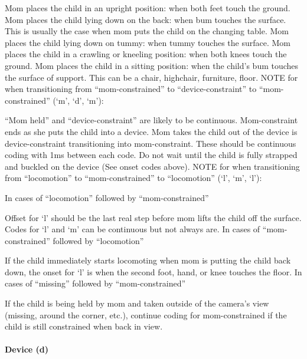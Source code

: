 \documentclass[
  12pt,
]{book}
\begin{document}
Mom places the child in an upright position: when both feet touch the ground.
Mom places the child lying down on the back: when bum touches the surface. This is usually the case when mom puts the child on the changing table.
Mom places the child lying down on tummy: when tummy touches the surface.
Mom places the child in a crawling or kneeling position: when both knees touch the ground.
Mom places the child in a sitting position: when the child's bum touches the surface of support. This can be a chair, highchair, furniture, floor.
NOTE for when transitioning from ``mom-constrained'' to ``device-constraint'' to ``mom-constrained'' (`m', `d', `m'):

``Mom held'' and ``device-constraint'' are likely to be continuous. Mom-constraint ends as she puts the child into a device. Mom takes the child out of the device is device-constraint transitioning into mom-constraint.
These should be continuous coding with 1ms between each code. Do not wait until the child is fully strapped and buckled on the device (See onset codes above).
NOTE for when transitioning from ``locomotion'' to ``mom-constrained'' to ``locomotion'' (`l', `m', `l'):

In cases of ``locomotion'' followed by ``mom-constrained''

Offset for `l' should be the last real step before mom lifts the child off the surface. Codes for `l' and `m' can be continuous but not always are.
In cases of ``mom-constrained'' followed by ``locomotion''

If the child immediately starts locomoting when mom is putting the child back down, the onset for `l' is when the second foot, hand, or knee touches the floor.
In cases of ``missing'' followed by ``mom-constrained''

If the child is being held by mom and taken outside of the camera's view (missing, around the corner, etc.), continue coding for mom-constrained if the child is still constrained when back in view.

\hypertarget{device_constrained}{%
\paragraph*{Device (d)}\label{device_constrained}}
\end{document}
